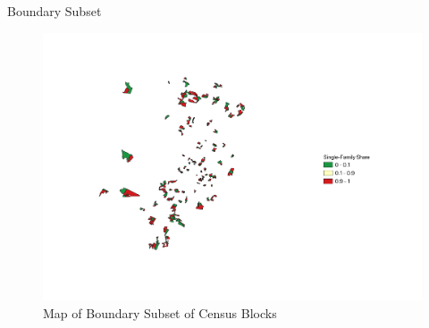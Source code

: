 \documentclass{beamer}
\begin{document}
\begin{frame}{Boundary Subset}
    \begin{figure}[h]
    \centering
    \includegraphics[width=\textwidth]{fig_2_causal_redone.pdf}
    \caption{Map of Boundary Subset of Census Blocks}
    \label{fig:Causal_Map}
\end{figure}
\end{frame}
\end{document}
